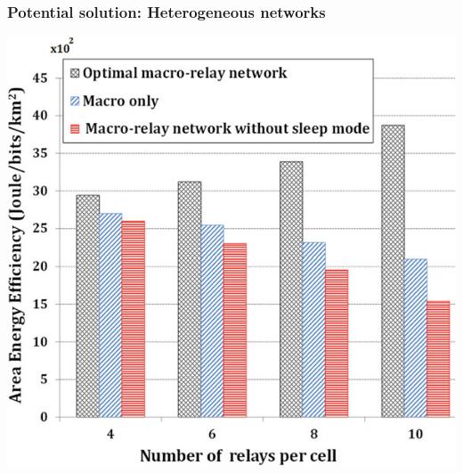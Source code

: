 \documentclass[a4paper,11pt,handout]{beamer}
\begin{document}
\begin{frame}
	\frametitle{Potential solution: Heterogeneous networks }

    \begin{center}
	\includegraphics[scale=0.7]{5GRoadmap-10_key_enabling_technologies-COMNET}
	\end{center} 
\end{frame}
\end{document}
